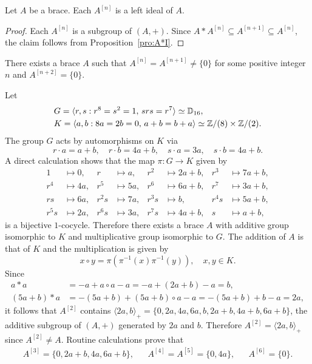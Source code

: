 \begin{proposition}
    \label{pro:Smoktunowicz}
    Let $A$ be a brace. Each $A^{[n]}$ is a left ideal of $A$.
\end{proposition}

\begin{proof}
    Each $A^{[n]}$ is a subgroup of $(A,+)$. Since
    $A*A^{[n]}\subseteq A^{[n+1]}\subseteq A^{[n]}$, the claim follows from
    Proposition~\ref{pro:A*I}.
\end{proof}

There exists a brace $A$ such that $A^{[n]}=A^{[n+1]}\ne\{0\}$
for some positive integer $n$ and $A^{[n+2]}=\{0\}$.

\begin{example}
    \label{exa:funny}
    Let
    \begin{align*}
        &G=\langle r,s:r^8=s^2=1,\,srs=r^7\rangle\simeq\mathbb{D}_{16},\\
        &K=\langle a,b:8a=2b=0,\,a+b=b+a\rangle\simeq \mathbb{Z}/(8)\times \mathbb{Z}/(2).
    \end{align*}
    The group $G$ acts by automorphisms on $K$ via
    \[
        r\cdot a=a+b,\quad r\cdot b=4a+b,\quad
        s\cdot a=3a, \quad s\cdot b=4a+b.
    \]
    A direct calculation shows that the map $\pi\colon G\to K$  given by
    \begin{align*}
        1 &\mapsto 0, & r&\mapsto a, & r^2&\mapsto 2a+b, & r^3&\mapsto 7a+b,\\
        r^4 &\mapsto 4a, & r^5&\mapsto 5a, & r^6&\mapsto 6a+b, & r^7&\mapsto 3a+b,\\
        rs &\mapsto 6a, & r^2s&\mapsto 7a, & r^3s&\mapsto b, &r^4s&\mapsto 5a+b,\\
        r^5s &\mapsto 2a, & r^6s&\mapsto 3a, &r^7s&\mapsto 4a+b,&s&\mapsto a+b,
    \end{align*}
    is a bijective $1$-cocycle. Therefore there exists a brace $A$ with
    additive group isomorphic to $K$ and multiplicative group isomorphic to
    $G$. The addition of $A$ is that of $K$ and the multiplication is given by
    \[
        x\circ y=\pi(\pi^{-1}(x)\pi^{-1}(y)),\quad x,y\in K.
    \]
    Since
    \begin{align*}
        a*a&=-a+a\circ a-a=-a+(2a+b)-a=b,\\
        (5a+b)*a&=-(5a+b)+(5a+b)\circ a-a=-(5a+b)+b-a=2a,
    \end{align*}
    it follows that $A^{[2]}$ contains $\langle
    2a,b\rangle_+=\{0,2a,4a,6a,b,2a+b,4a+b,6a+b\}$, the additive subgroup of
    $(A,+)$ generated by $2a$ and $b$. Therefore $A^{[2]}=\langle 2a,b\rangle_+$
    since $A^{[2]}\ne A$. Routine calculations prove that
    \begin{align*}
        A^{[3]}=\{0,2a+b,4a,6a+b\}, && A^{[4]}=A^{[5]}=\{0,4a\}, && A^{[6]}=\{0\}.
    \end{align*}
\end{example}


